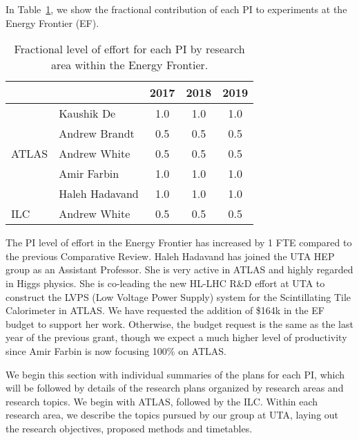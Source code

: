 
In Table~\ref{table:ef-fractions}, we show the fractional contribution of each PI to experiments at the Energy Frontier (EF).

\begin{table}[htb]
\centering
\begin{tabular}{ l | l | c | c | c }
\hline \hline
\multicolumn{2}{c|}{} & 2017 & 2018 & 2019 \\ \hline
\multirow{5}{*}{ATLAS} & Kaushik De & 1.0 & 1.0 & 1.0 \\ \cline{2-5}
 & Andrew Brandt & 0.5 & 0.5 & 0.5 \\ \cline{2-5}
 & Andrew White & 0.5 & 0.5 & 0.5 \\ \cline{2-5}
 & Amir Farbin & 1.0 & 1.0 &1.0 \\ \hline
 & Haleh Hadavand & 1.0 & 1.0 & 1.0 \\ \cline{2-5}
ILC & Andrew White & 0.5 & 0.5 & 0.5 \\ \hline  \hline
\end{tabular}
\caption{Fractional level of effort for each PI by research area within the Energy Frontier.}
\label{table:ef-fractions}
\end{table}

The PI level of effort in the Energy Frontier has increased by 1 FTE compared to the previous Comparative Review. Haleh Hadavand has joined the UTA HEP group as an Assistant Professor. She is very active in ATLAS and highly regarded in Higgs physics. She is co-leading the new HL-LHC R\&D effort at UTA to construct the LVPS (Low Voltage Power Supply) system for the Scintillating Tile Calorimeter in ATLAS. We have requested the addition of \$164k in the EF budget to support her work. Otherwise, the budget request is the same as the last year of the previous grant, though we expect a much higher level of productivity since Amir Farbin is now focusing 100\% on ATLAS.

We begin this section with individual summaries of the plans for each PI, which will be followed by details of the research plans organized by research areas and research topics. We begin with ATLAS, followed by the ILC. Within each research area, we describe the topics pursued by our group at UTA, laying out the research objectives, proposed methods and timetables.

